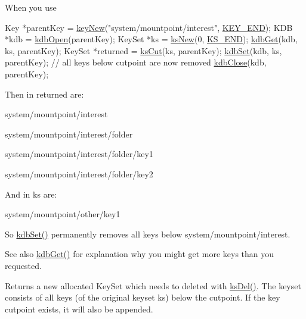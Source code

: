 When you use 
\begin{DoxyCodeInclude}
        Key *parentKey = \hyperlink{group__key_gad23c65b44bf48d773759e1f9a4d43b89}{keyNew}(\textcolor{stringliteral}{"system/mountpoint/interest"}, \hyperlink{group__key_gga91fb3178848bd682000958089abbaf40aa8adb6fcb92dec58fb19410eacfdd403}{KEY\_END});
        KDB *kdb = \hyperlink{group__kdb_ga6808defe5870f328dd17910aacbdc6ca}{kdbOpen}(parentKey);
        KeySet *ks = \hyperlink{group__keyset_ga671e1aaee3ae9dc13b4834a4ddbd2c3c}{ksNew}(0, \hyperlink{kdbenum_8c_a7a28fce3773b2c873c94ac80b8b4cd54}{KS\_END});
        \hyperlink{group__kdb_ga28e385fd9cb7ccfe0b2f1ed2f62453a1}{kdbGet}(kdb, ks, parentKey);
        KeySet *returned = \hyperlink{group__keyset_ga6b00cf82b59af4d883a9bad6cf4a4a4a}{ksCut}(ks, parentKey);
        \hyperlink{group__kdb_ga11436b058408f83d303ca5e996832bcf}{kdbSet}(kdb, ks, parentKey); \textcolor{comment}{// all keys below cutpoint are now removed}
        \hyperlink{group__kdb_gadb54dc9fda17ee07deb9444df745c96f}{kdbClose}(kdb, parentKey);
\end{DoxyCodeInclude}
 Then in {\ttfamily returned} are\+:
\begin{DoxyItemize}
\item {\ttfamily system/mountpoint/interest} 
\item {\ttfamily system/mountpoint/interest/folder} 
\item {\ttfamily system/mountpoint/interest/folder/key1} 
\item {\ttfamily system/mountpoint/interest/folder/key2} 
\end{DoxyItemize}

And in {\ttfamily ks} are\+:
\begin{DoxyItemize}
\item {\ttfamily system/mountpoint/other/key1} 
\end{DoxyItemize}

So \hyperlink{group__kdb_ga11436b058408f83d303ca5e996832bcf}{kdb\+Set()} permanently removes all keys below {\ttfamily system/mountpoint/interest}.

\begin{DoxySeeAlso}{See also}
\hyperlink{group__kdb_ga28e385fd9cb7ccfe0b2f1ed2f62453a1}{kdb\+Get()} for explanation why you might get more keys than you requested.
\end{DoxySeeAlso}
\begin{DoxyReturn}{Returns}
a new allocated Key\+Set which needs to deleted with \hyperlink{group__keyset_ga27e5c16473b02a422238c8d970db7ac8}{ks\+Del()}. The keyset consists of all keys (of the original keyset ks) below the cutpoint. If the key cutpoint exists, it will also be appended. 
\end{DoxyReturn}

